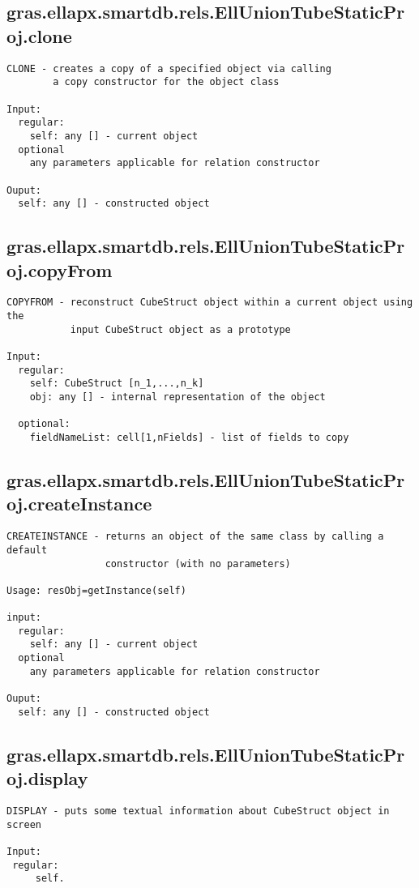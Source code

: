 \subsection{\texorpdfstring{gras.ellapx.smartdb.rels.EllUnionTubeStaticProj.clone}{clone}}\label{method:gras.ellapx.smartdb.rels.EllUnionTubeStaticProj.clone}
\begin{verbatim}
CLONE - creates a copy of a specified object via calling
        a copy constructor for the object class

Input:
  regular:
    self: any [] - current object
  optional
    any parameters applicable for relation constructor

Ouput:
  self: any [] - constructed object
\end{verbatim}
\subsection{\texorpdfstring{gras.ellapx.smartdb.rels.EllUnionTubeStaticProj.copyFrom}{copyFrom}}\label{method:gras.ellapx.smartdb.rels.EllUnionTubeStaticProj.copyFrom}
\begin{verbatim}
COPYFROM - reconstruct CubeStruct object within a current object using the
           input CubeStruct object as a prototype

Input:
  regular:
    self: CubeStruct [n_1,...,n_k]
    obj: any [] - internal representation of the object

  optional:
    fieldNameList: cell[1,nFields] - list of fields to copy
\end{verbatim}
\subsection{\texorpdfstring{gras.ellapx.smartdb.rels.EllUnionTubeStaticProj.createInstance}{createInstance}}\label{method:gras.ellapx.smartdb.rels.EllUnionTubeStaticProj.createInstance}
\begin{verbatim}
CREATEINSTANCE - returns an object of the same class by calling a default
                 constructor (with no parameters)

Usage: resObj=getInstance(self)

input:
  regular:
    self: any [] - current object
  optional
    any parameters applicable for relation constructor

Ouput:
  self: any [] - constructed object
\end{verbatim}
\subsection{\texorpdfstring{gras.ellapx.smartdb.rels.EllUnionTubeStaticProj.display}{display}}\label{method:gras.ellapx.smartdb.rels.EllUnionTubeStaticProj.display}
\begin{verbatim}
DISPLAY - puts some textual information about CubeStruct object in screen

Input:
 regular:
     self.
\end{verbatim}
